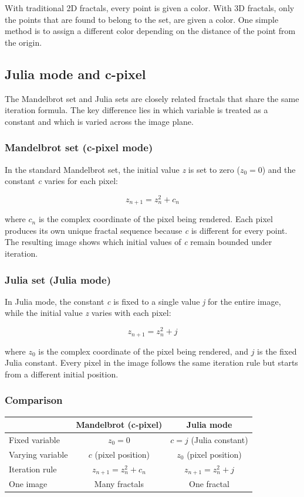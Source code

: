 With traditional 2D fractals, every point is given a color. With 3D fractals,
only the points that are found to belong to the set, are given a color.
One simple method is to assign a different color depending on the distance of the point from the origin.

\subsection{Julia mode and c-pixel}\label{julia-mode}

The Mandelbrot set and Julia sets are closely related fractals that share the same iteration formula. The key difference lies in which variable is treated as a constant and which is varied across the image plane.

\subsubsection{Mandelbrot set (c-pixel mode)}

In the standard Mandelbrot set, the initial value \emph{z} is set to zero ($ z_0 = 0 $) and the constant \emph{c} varies for each pixel:

\[z_{n + 1} = z_{n}^{2} + c_n\]

where $ c_n $ is the complex coordinate of the pixel being rendered. Each pixel produces its own unique fractal sequence because \emph{c} is different for every point. The resulting image shows which initial values of \emph{c} remain bounded under iteration.

\subsubsection{Julia set (Julia mode)}

In Julia mode, the constant \emph{c} is fixed to a single value \emph{j} for the entire image, while the initial value \emph{z} varies with each pixel:

\[z_{n + 1} = z_{n}^{2} + j\]

where $ z_0 $ is the complex coordinate of the pixel being rendered, and $ j $ is the fixed Julia constant. Every pixel in the image follows the same iteration rule but starts from a different initial position.

\subsubsection{Comparison}

\begin{center}
\begin{tabular}{l|c|c}
           & \textbf{Mandelbrot (c-pixel)} & \textbf{Julia mode} \\
\hline
Fixed variable & $ z_0 = 0 $ & $ c = j $ (Julia constant) \\
Varying variable & $ c $ (pixel position) & $ z_0 $ (pixel position) \\
Iteration rule & $ z_{n+1} = z_n^2 + c_n $ & $ z_{n+1} = z_n^2 + j $ \\
One image & Many fractals & One fractal \\
\end{tabular}
\end{center}

